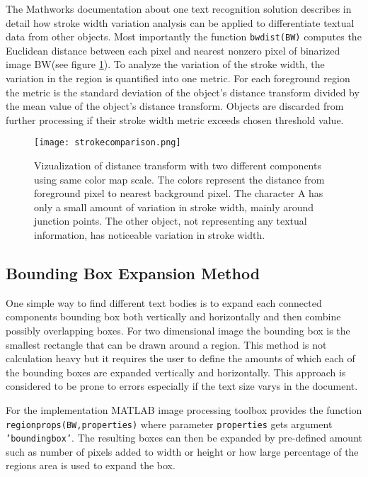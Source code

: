 \documentclass{article}
\def\code#1{\texttt{#1}}
\begin{document}
          The Mathworks documentation about one text recognition solution describes in detail how stroke width variation analysis can be applied to differentiate textual data from other objects. \cite{MathworksTextRecognition} Most importantly the function \code{bwdist(BW)} computes the Euclidean distance between each pixel and nearest nonzero pixel of binarized image BW(see figure \ref{fig:strokewidth}). To analyze the variation of the stroke width, the variation in the region is quantified into one metric. For each foreground region the metric is the standard deviation of the object's distance transform divided by the mean value of the object's distance transform. Objects are discarded from further processing if their stroke width metric exceeds chosen threshold value.

          \begin{figure}[!ht]
            \centering
            \texttt{[image: strokecomparison.png]}
            \caption{Vizualization of distance transform with two different components using same color map scale. The colors represent the distance from foreground pixel to nearest background pixel. The character A has only a small amount of variation in stroke width, mainly around junction points. The other object, not representing any textual information, has noticeable variation in stroke width. \label{fig:strokewidth} }
          \end{figure}

        \subsection{Bounding Box Expansion Method}
          One simple way to find different text bodies is to expand each connected components bounding box both vertically and horizontally and then combine possibly overlapping boxes. For two dimensional image the bounding box is the smallest rectangle that can be drawn around a region. This method is not calculation heavy but it requires the user to define the amounts of which each of the bounding boxes are expanded vertically and horizontally. This approach is considered to be prone to errors especially if the text size varys in the document.

          For the implementation MATLAB image processing toolbox provides the function \code{regionprops(BW,properties)} where parameter \code{properties} gets argument \code{'boundingbox'}. The resulting boxes can then be expanded by pre-defined amount such as number of pixels added to width or height or how large percentage of the regions area is used to expand the box.
\end{document}

